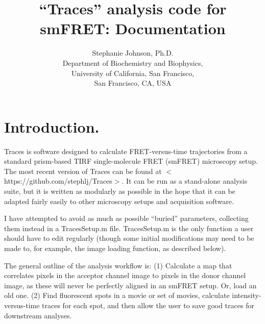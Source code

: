 \documentclass[11pt]{article}
\begin{document}
\title{``Traces'' analysis code for smFRET: Documentation}

\author{%
Stephanie Johnson, Ph.D.\\Department of Biochemistry and
     Biophysics, \\University of California, San Francisco, \\San Francisco, CA, USA\\
}
\date{}

\maketitle

\tableofcontents

\newpage

\section{Introduction.}

Traces is software designed to calculate FRET-versus-time trajectories from a standard prism-based TIRF single-molecule FRET (smFRET) microscopy setup.  The most recent version of Traces can be found at $<$https://github.com/stephlj/Traces$>$.  It can be run as a stand-alone analysis suite, but it is written as modularly as possible in the hope that it can be adapted fairly easily to other microscopy setups and acquisition software.  

I have attempted to avoid as much as possible ``buried'' parameters, collecting them instead in a TracesSetup.m file.  TracesSetup.m is the only function a user should have to edit regularly (though some initial modifications may need to be made to, for example, the image loading function, as described below). %

The general outline of the analysis workflow is: (1) Calculate a map that correlates pixels in the acceptor channel image to pixels in the donor channel image, as these will never be perfectly aligned in an smFRET setup. Or, load an old one. (2) Find fluorescent spots in a movie or set of movies, calculate intensity-versus-time traces for each spot, and then allow the user to save good traces for downstream analyses.
\end{document}
